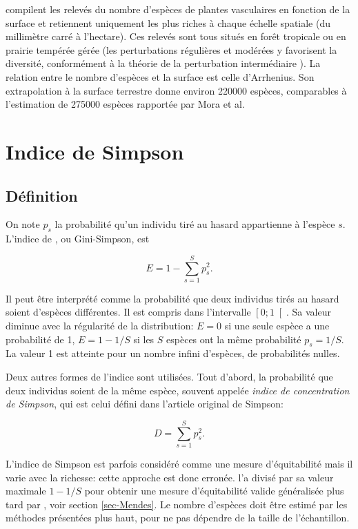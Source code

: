 \documentclass[
  11pt,
  american,
  a4paper,
  extrafontsizes,onecolumn,openright
  ]{memoir}
\newlength{\rf}
\begin{document}
\textcite{Wilson2012} compilent les relevés du nombre d'espèces de plantes vasculaires en fonction de la surface et retiennent uniquement les plus riches à chaque échelle spatiale (du millimètre carré à l'hectare).
Ces relevés sont tous situés en forêt tropicale ou en prairie tempérée gérée (les perturbations régulières et modérées y favorisent la diversité, conformément à la théorie de la perturbation intermédiaire \autocite{Connell1978}).
La relation entre le nombre d'espèces et la surface est celle d'Arrhenius.
Son extrapolation à la surface terrestre donne environ 220000 espèces, comparables à l'estimation de 275000 espèces rapportée par Mora et al.

\section{Indice de Simpson}\label{indice-de-simpson}

\subsection{Définition}\label{duxe9finition}

On note \(p_s\) la probabilité qu'un individu tiré au hasard appartienne à l'espèce \(s\).
L'indice de \textcite{Simpson1949}, ou Gini-Simpson, est

\begin{equation}
  \label{eq:SimpsonE}
  E = 1 - \sum^{S}_{s=1}{p^2_s}.
\end{equation}

Il peut être interprété comme la probabilité que deux individus tirés au hasard soient d'espèces différentes.
Il est compris dans l'intervalle \(\left[ 0 ; 1 \right[\).
Sa valeur diminue avec la régularité de la distribution: \(E=0\) si une seule espèce a une probabilité de 1, \(E = 1 - 1 / S\) si les \(S\) espèces ont la même probabilité \(p_s = 1 / S\).
La valeur 1 est atteinte pour un nombre infini d'espèces, de probabilités nulles.

Deux autres formes de l'indice sont utilisées.
Tout d'abord, la probabilité que deux individus soient de la même espèce, souvent appelée \emph{indice de concentration de Simpson}, qui est celui défini dans l'article original de Simpson:

\begin{equation}
  \label{eq:SimpsonD}
  D = \sum^{S}_{s=1}{p^2_s}.
\end{equation}

L'indice de Simpson est parfois considéré comme une mesure d'équitabilité \autocite{Olszewski2004} mais il varie avec la richesse: cette approche est donc erronée.
\textcite{Hurlbert1971} l'a divisé par sa valeur maximale \(1 - 1 / S\) pour obtenir une mesure d'équitabilité valide généralisée plus tard par \textcite{Mendes2008}, voir section \ref{sec-Mendes}.
Le nombre d'espèces doit être estimé par les méthodes présentées plus haut, pour ne pas dépendre de la taille de l'échantillon.
\end{document}
